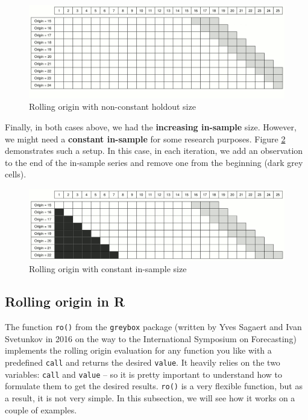 \documentclass[
]{book}
\theoremstyle{definition}
\theoremstyle{definition}
\theoremstyle{definition}
\theoremstyle{definition}
\theoremstyle{remark}
\begin{document}
\begin{figure}
\includegraphics[width=0.75\linewidth]{./images/03-ROProcessNoCO} \caption{Rolling origin with non-constant holdout size}\label{fig:ROProcessNoCO}
\end{figure}

Finally, in both cases above, we had the \textbf{increasing in-sample} size. However, we might need a \textbf{constant in-sample} for some research purposes. Figure \ref{fig:ROProcessCOCI} demonstrates such a setup. In this case, in each iteration, we add an observation to the end of the in-sample series and remove one from the beginning (dark grey cells).

\begin{figure}
\includegraphics[width=0.75\linewidth]{./images/03-ROProcessCOCI} \caption{Rolling origin with constant in-sample size}\label{fig:ROProcessCOCI}
\end{figure}

\hypertarget{rolling-origin-in-r}{%
\subsection{Rolling origin in R}\label{rolling-origin-in-r}}

The function \texttt{ro()} from the \texttt{greybox} package (written by Yves Sagaert and Ivan Svetunkov in 2016 on the way to the International Symposium on Forecasting) implements the rolling origin evaluation for any function you like with a predefined \texttt{call} and returns the desired \texttt{value}. It heavily relies on the two variables: \texttt{call} and \texttt{value} -- so it is pretty important to understand how to formulate them to get the desired results. \texttt{ro()} is a very flexible function, but as a result, it is not very simple. In this subsection, we will see how it works on a couple of examples.
\end{document}
